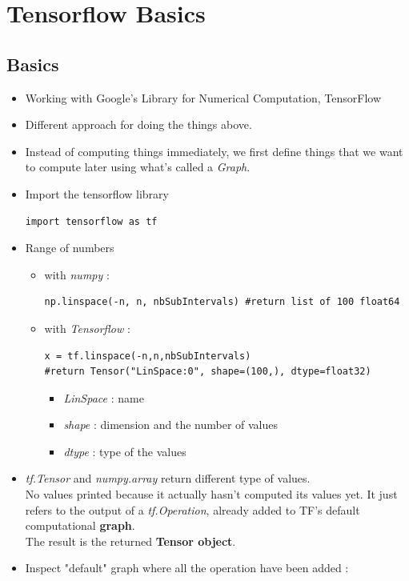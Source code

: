 \documentclass[12pt,a4paper]{article}
\begin{document}
\section{Tensorflow Basics}
\subsection{Basics}
\begin{itemize}
\item Working with Google's Library for Numerical Computation, TensorFlow
\item Different approach for doing the things above.
\item Instead of computing things immediately, we first define things that we want to compute later using what's called a \textit{Graph}.
\item Import the tensorflow library
\begin{lstlisting}
import tensorflow as tf
\end{lstlisting}
\item Range of numbers 
\begin{itemize}
\item with \textit{numpy} :
\begin{lstlisting}
np.linspace(-n, n, nbSubIntervals) #return list of 100 float64
\end{lstlisting}
\item with \textit{Tensorflow} :
\begin{lstlisting}
x = tf.linspace(-n,n,nbSubIntervals)
#return Tensor("LinSpace:0", shape=(100,), dtype=float32)
\end{lstlisting}
\begin{itemize}
\item \textit{LinSpace} : name
\item \textit{shape} : dimension and the number of values
\item \textit{dtype} : type of the values
\end{itemize}
\end{itemize}
\item \textit{tf.Tensor} and \textit{numpy.array} return different type of values.\\
No values printed because it actually hasn't computed its values yet. It just refers to the output of a \textit{tf.Operation}, already added to TF's default computational \textbf{graph}.\\
The result is the returned \textbf{Tensor object}.
\item Inspect "default" graph where all the operation have been added :

\end{itemize}
\end{document}

